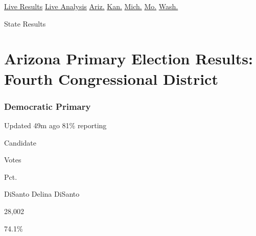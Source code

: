 \href{https://www.nytimes3xbfgragh.onion/interactive/2020/08/04/us/elections/results-arizona-kansas-michigan-missouri-primaries.html?action=click\&module=ELEX_results\&pgtype=Interactive\&region=Navigation}{Live
Results}
\href{https://www.nytimes3xbfgragh.onion/interactive/2020/08/04/us/elections/live-analysis-arizona-kansas-michigan-missouri-primaries.html?action=click\&module=ELEX_results\&pgtype=Interactive\&region=Navigation}{Live
Analysis}
\href{https://www.nytimes3xbfgragh.onion/interactive/2020/08/04/us/elections/results-arizona-primary-elections.html?action=click\&module=ELEX_results\&pgtype=Interactive\&region=Navigation}{Ariz.}
\href{https://www.nytimes3xbfgragh.onion/interactive/2020/08/04/us/elections/results-kansas-primary-elections.html?action=click\&module=ELEX_results\&pgtype=Interactive\&region=Navigation}{Kan.}
\href{https://www.nytimes3xbfgragh.onion/interactive/2020/08/04/us/elections/results-michigan-primary-elections.html?action=click\&module=ELEX_results\&pgtype=Interactive\&region=Navigation}{Mich.}
\href{https://www.nytimes3xbfgragh.onion/interactive/2020/08/04/us/elections/results-missouri-primary-elections.html?action=click\&module=ELEX_results\&pgtype=Interactive\&region=Navigation}{Mo.}
\href{https://www.nytimes3xbfgragh.onion/interactive/2020/08/04/us/elections/results-washington-primary-elections.html?action=click\&module=ELEX_results\&pgtype=Interactive\&region=Navigation}{Wash.}

 State Results

\hypertarget{arizona-primary-election-results-fourth-congressional-district-1}{%
\section{Arizona Primary Election Results: Fourth Congressional
District}\label{arizona-primary-election-results-fourth-congressional-district-1}}

\hypertarget{democratic-primary}{%
\subsubsection{Democratic Primary}\label{democratic-primary}}

Updated 49m ago 81\% reporting

Candidate

Votes

Pct.

 DiSanto Delina DiSanto

28,002

74.1\%


